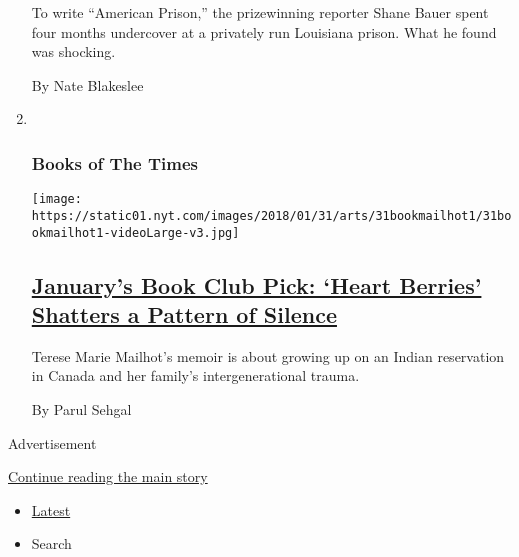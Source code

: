 \begin{enumerate}
  To write ``American Prison,'' the prizewinning reporter Shane Bauer
  spent four months undercover at a privately run Louisiana prison. What
  he found was shocking.

  By Nate Blakeslee
\item ~
  \hypertarget{books-of-the-times-1}{%
  \subsubsection{Books of The Times}\label{books-of-the-times-1}}

  \texttt{[image: https://static01.nyt.com/images/2018/01/31/arts/31bookmailhot1/31bookmailhot1-videoLarge-v3.jpg]}

  \hypertarget{januarys-book-club-pick-heart-berries-shatters-a-pattern-of-silence}{%
  \subsection{\texorpdfstring{\href{/2018/01/30/books/review-heart-berries-terese-marie-mailhot.html}{January's
  Book Club Pick: `Heart Berries' Shatters a Pattern of
  Silence}}{January's Book Club Pick: `Heart Berries' Shatters a Pattern of Silence}}\label{januarys-book-club-pick-heart-berries-shatters-a-pattern-of-silence}}

  Terese Marie Mailhot's memoir is about growing up on an Indian
  reservation in Canada and her family's intergenerational trauma.

  By Parul Sehgal
\end{enumerate}

Advertisement

\protect\hyperlink{after-mid1}{Continue reading the main story}

\begin{itemize}
\tightlist
\item
  \protect\hyperlink{stream-panel}{Latest}
\item
  Search
\end{itemize}

